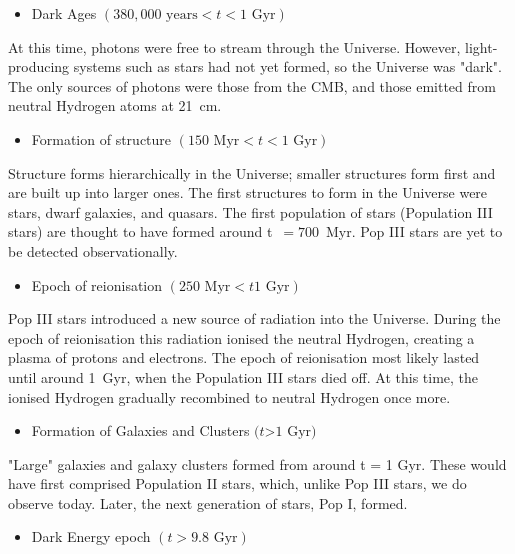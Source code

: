 \documentclass[11pt,a4paper,notoc]{tufte-handout}
\providecommand{\tightlist}{%
  \setlength{\itemsep}{0pt}\setlength{\parskip}{0pt}}
\begin{document}
\begin{itemize}
\tightlist
\item
  Dark Ages \((380,000 \text{ years}< t < 1\text{ Gyr})\)
\end{itemize}

At this time, photons were free to stream through the Universe. However,
light-producing systems such as stars had not yet formed, so the
Universe was "dark". The only sources of photons were those from the
CMB, and those emitted from neutral Hydrogen atoms at 21~cm.

\begin{itemize}
\tightlist
\item
  Formation of structure \((150\text{ Myr} < t < 1\text{ Gyr})\)
\end{itemize}

Structure forms hierarchically in the Universe; smaller structures form
first and are built up into larger ones. The first structures to form in
the Universe were stars, dwarf galaxies, and quasars. The first
population of stars (Population III stars) are thought to have formed
around t~\(=700\)~Myr. Pop III stars are yet to be detected
observationally.

\begin{itemize}
\tightlist
\item
  Epoch of reionisation \((250 \text{ Myr} < t 1\text{ Gyr})\)
\end{itemize}

Pop III stars introduced a new source of radiation into the Universe.
During the epoch of reionisation this radiation ionised the neutral
Hydrogen, creating a plasma of protons and electrons. The epoch of
reionisation most likely lasted until around 1~Gyr, when the Population
III stars died off. At this time, the ionised Hydrogen gradually
recombined to neutral Hydrogen once more.

\begin{itemize}
\tightlist
\item
  Formation of Galaxies and Clusters \((t\)\textgreater{}\(1 \text{ Gyr})\)
\end{itemize}

"Large" galaxies and galaxy clusters formed from around t = 1 Gyr.
These would have first comprised Population II stars, which, unlike Pop
III stars, we do observe today. Later, the next generation of stars, Pop
I, formed.

\begin{itemize}
\tightlist
\item
  Dark Energy epoch \((t > 9.8 \text{ Gyr})\)
\end{itemize}
\end{document}
